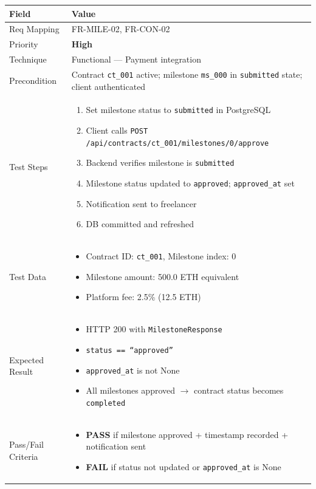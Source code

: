 \documentclass[12pt,a4paper]{article}
\newcommand{\sevhigh}{\textcolor{severityhigh}{\textbf{High}}}
\newcommand{\passresult}{\textcolor{passgreen}{\textbf{PASS}}}
\newcommand{\failresult}{\textcolor{failred}{\textbf{FAIL}}}
\begin{document}
\begin{tabular}{|p{}|p{}|}
\hline
\rowcolor{lightblue} \textbf{Field} & \textbf{Value} \\
\hline
Req Mapping & FR-MILE-02, FR-CON-02 \\
\hline
Priority & \sevhigh \\
\hline
Technique & Functional --- Payment integration \\
\hline
Precondition & Contract \texttt{ct\_001} active; milestone \texttt{ms\_000} in \texttt{submitted} state; client authenticated \\
\hline
Test Steps &
\begin{enumerate}[nosep, leftmargin=*]
  \item Set milestone status to \texttt{submitted} in PostgreSQL
  \item Client calls \texttt{POST /api/contracts/ct\_001/milestones/0/approve}
  \item Backend verifies milestone is \texttt{submitted}
  \item Milestone status updated to \texttt{approved}; \texttt{approved\_at} set
  \item Notification sent to freelancer
  \item DB committed and refreshed
\end{enumerate} \\
\hline
Test Data &
\begin{itemize}[nosep, leftmargin=*]
  \item Contract ID: \texttt{ct\_001}, Milestone index: 0
  \item Milestone amount: 500.0 ETH equivalent
  \item Platform fee: 2.5\% (12.5 ETH)
\end{itemize} \\
\hline
Expected Result &
\begin{itemize}[nosep, leftmargin=*]
  \item HTTP 200 with \texttt{MilestoneResponse}
  \item \texttt{status == ``approved''}
  \item \texttt{approved\_at} is not None
  \item All milestones approved $\rightarrow$ contract status becomes \texttt{completed}
\end{itemize} \\
\hline
Pass/Fail Criteria &
\begin{itemize}[nosep, leftmargin=*]
  \item \passresult{} if milestone approved + timestamp recorded + notification sent
  \item \failresult{} if status not updated or \texttt{approved\_at} is None
\end{itemize} \\
\hline
\end{tabular}
\end{document}

